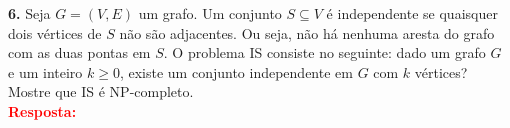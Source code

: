 
\noindent\textbf{6.} Seja $G = (V, E)$ um grafo. Um conjunto $S \subseteq V$ é independente se quaisquer dois vértices de $S$ não são adjacentes. Ou seja, não há nenhuma aresta do grafo com as duas pontas em $S$. O problema
IS consiste no seguinte: dado um grafo $G$ e um inteiro $k \geq 0$, existe um conjunto independente em $G$ com $k$ vértices? Mostre que IS é NP-completo.\\[6pt]
\textcolor{red}{\textbf{Resposta:}}